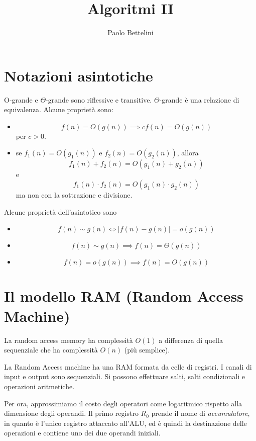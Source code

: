 \documentclass[a4paper]{article}
\title{Algoritmi II}
\author{Paolo Bettelini}
\date{}
\begin{document}
\maketitle
\tableofcontents

\section{Notazioni asintotiche}

O-grande e \(\Theta\)-grande sono riflessive e transitive.
\(\Theta\)-grande è una relazione di equivalenza.
Alcune proprietà sono:
\begin{itemize}
    \item \[
        f(n) = O(g(n)) \implies cf(n) = O(g(n))
    \]
    per \(c>0\).
    \item se \(f_1(n) = O(g_1(n))\) e \(f_2(n) = O(g_2(n))\), allora
    \[
        f_1(n) + f_2(n) = O(g_1(n) + g_2(n))
    \]
    e
    \[
        f_1(n) \cdot f_2(n) = O(g_1(n) \cdot g_2(n))
    \]
    ma non con la sottrazione e divisione.
\end{itemize}


Alcune proprietà dell'asintotico sono

\begin{itemize}
    \item \[
        f(n) \sim g(n) \iff |f(n) - g(n)| = o(g(n))
    \]
    \item \[
        f(n) \sim g(n) \implies f(n) = \Theta(g(n))
    \]
    \item \[
        f(n) = o(g(n)) \implies f(n) = O(g(n))
    \]
\end{itemize}

\section{Il modello RAM (Random Access Machine)}

La random access memory ha complessità \(O(1)\) a differenza di quella sequenziale che
ha complessità \(O(n)\) (più semplice).

La Random Access machine ha una RAM formata da celle di registri.
I canali di input e output sono sequenziali. Si possono effettuare salti, salti condizionali e operazioni aritmetiche.

Per ora, approssimiamo il costo degli operatori come logaritmico rispetto alla dimensione
degli operandi. Il primo registro \(R_0\) prende il nome di \emph{accumulatore},
in quanto è l'unico registro attaccato all'ALU, ed è quindi la destinazione delle operazioni e
contiene uno dei due operandi iniziali.

\end{document}

